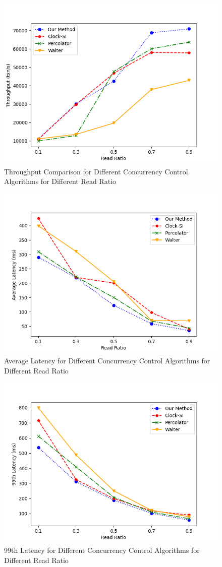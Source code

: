 \begin{figure}[H]
    \centering
    \includegraphics[width=0.8\linewidth]{figure/31.png}
    \caption{Throughput Comparison for Different Concurrency Control Algorithms for Different Read Ratio}
    \label{fig:31}
\end{figure}
\begin{figure}[H]
    \centering
    \includegraphics[width=0.8\linewidth]{figure/32.png}
    \caption{Average Latency for Different Concurrency Control Algorithms for Different Read Ratio}
    \label{fig:32}
\end{figure}
\begin{figure}[H]
    \centering
    \includegraphics[width=0.8\linewidth]{figure/33.png}
    \caption{99th Latency for Different Concurrency Control Algorithms for Different Read Ratio}
    \label{fig:33}
\end{figure}



